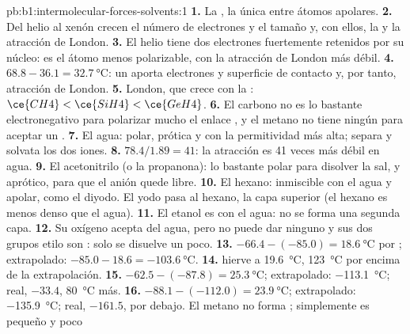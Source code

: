 \begin{solution}{pb:b1:intermolecular-forces-solvents:1}
\textbf{1.} La , la única entre átomos apolares.
\textbf{2.} Del helio al xenón crecen el número de electrones y el tamaño
y, con ellos, la  y la atracción de London.
\textbf{3.} El helio tiene dos electrones fuertemente retenidos por su
núcleo: es el átomo menos polarizable, con la atracción de London más
débil.
\textbf{4.} $68.8 - 36.1 = \qty{32.7}{\celsius}$: un  aporta
electrones y superficie de contacto y, por tanto, atracción de London.
\textbf{5.} London, que crece con la : $\ce{CH4} < \ce{SiH4} <
\ce{GeH4}$.
\textbf{6.} El carbono no es lo bastante electronegativo para polarizar
mucho el enlace , y el metano no tiene ningún 
para aceptar un .
\textbf{7.} El agua: polar, prótica y con la permitividad más alta; separa
y solvata los dos iones.
\textbf{8.} $78.4/1.89 = 41$: la atracción es 41 veces más débil en agua.
\textbf{9.} El acetonitrilo (o la propanona): lo bastante polar para
disolver la sal, y aprótico, para que el anión quede libre.
\textbf{10.} El hexano: inmiscible con el agua y apolar, como el diyodo. El
yodo pasa al hexano, la capa superior (el hexano es menos denso que el
agua).
\textbf{11.} El etanol es  con el agua: no se forma una segunda
capa.
\textbf{12.} Su oxígeno acepta  del agua, pero no puede
dar ninguno y sus dos grupos etilo son : solo se disuelve un
poco.
\textbf{13.} $-66.4 - (-85.0) = \qty{18.6}{\celsius}$ por ;
 extrapolado: $-85.0 - 18.6 = \qty{-103.6}{\celsius}$.
\textbf{14.}  hierve a \qty{19.6}{\celsius}, \qty{123}{\celsius}
por encima de la extrapolación.
\textbf{15.} $-62.5 - (-87.8) = \qty{25.3}{\celsius}$; 
extrapolado: \qty{-113.1}{\celsius}; real, $-33.4$, \qty{80}{\celsius}
más.
\textbf{16.} $-88.1 - (-112.0) = \qty{23.9}{\celsius}$; 
extrapolado: \qty{-135.9}{\celsius}; real, $-161.5$, por debajo. El metano
no forma ; simplemente es pequeño y poco

\end{solution}

